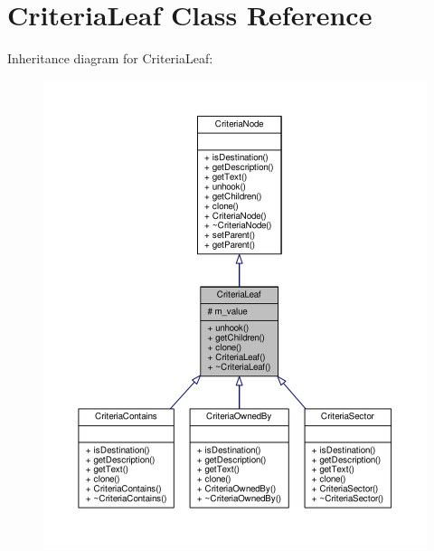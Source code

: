 \hypertarget{classCriteriaLeaf}{}\section{Criteria\+Leaf Class Reference}
\label{classCriteriaLeaf}


Inheritance diagram for Criteria\+Leaf\+:
\nopagebreak
\begin{figure}[H]
\begin{center}
\leavevmode
\includegraphics[width=350pt]{d7/deb/classCriteriaLeaf__inherit__graph}
\end{center}
\end{figure}


